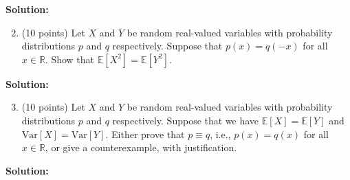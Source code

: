 \documentclass[11pt]{article}
\newcommand{\Ex}[1]{\ensuremath{\mathbb{E}\left[#1\right]}}
\newcommand{\Var}[1]{\ensuremath{\text{Var}\left[#1\right]}}
\begin{document}
\noindent\textbf{Solution:}













\begin{enumerate}
\setcounter{enumi}{1}
\item (10 points)
Let $X$ and $Y$ be random real-valued variables with probability distributions $p$ and $q$ respectively. 
Suppose that $p(x)=q(-x)$ for all $x\in\mathbb{R}$. 
Show that $\Ex{X^2}=\Ex{Y^2}$. 
\end{enumerate}

\noindent\textbf{Solution:}









\begin{enumerate}
\setcounter{enumi}{2}
\item (10 points)
Let $X$ and $Y$ be random real-valued variables with probability distributions $p$ and $q$ respectively. 
Suppose that we have $\Ex{X}=\Ex{Y}$ and $\Var{X}=\Var{Y}$. 
Either prove that $p\equiv q$, i.e., $p(x)=q(x)$ for all $x\in\mathbb{R}$, or give a counterexample, with justification. 
\end{enumerate}

\noindent\textbf{Solution:}
\end{document}
